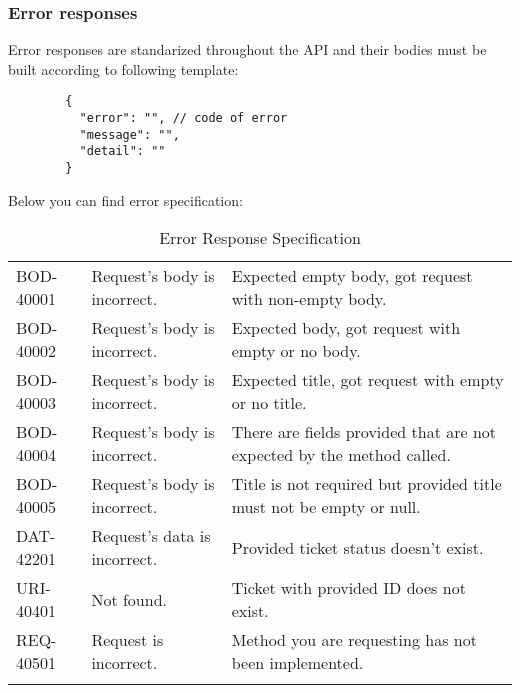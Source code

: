 \documentclass[a4paper]{article}
\begin{document}
    \subsubsection{Error responses}
    Error responses are standarized throughout the API and their bodies must be built according to following template:
    \begin{verbatim}
        {
          "error": "", // code of error
          "message": "",
          "detail": ""
        }
    \end{verbatim}
    Below you can find error specification:
    \begin{table}[htbp]
        \centering
        \caption{Error Response Specification}
        \begin{tabularx}{\linewidth}{|l|X|X|}
            \hline
            \centering{Error Code} & \centering{Message} & \centering{Detail} \tabularnewline \hline
            BOD-40001 & Request's body is incorrect. & Expected empty body, got request with non-empty body. \tabularnewline \hline
            BOD-40002 & Request's body is incorrect. & Expected body, got request with empty or no body. \tabularnewline \hline
            BOD-40003 & Request's body is incorrect. & Expected title, got request with empty or no title. \tabularnewline \hline
            BOD-40004 & Request's body is incorrect. & There are fields provided that are not expected by the method called. \tabularnewline \hline
            BOD-40005 & Request's body is incorrect. & Title is not required but provided title must not be empty or null. \tabularnewline \hline
            DAT-42201 & Request's data is incorrect. & Provided ticket status doesn't exist. \tabularnewline \hline
            URI-40401 & Not found. & Ticket with provided ID does not exist. \tabularnewline \hline
            REQ-40501 & Request is incorrect. & Method you are requesting has not been implemented. \tabularnewline \hline
            \hfill & \hfill & \hfill \tabularnewline \hline
        \end{tabularx}
    \end{table}
\end{document}

